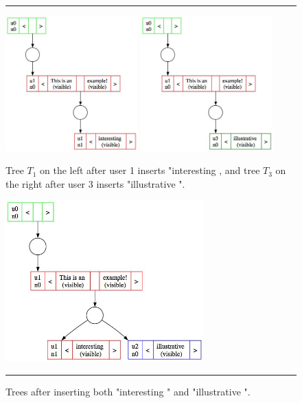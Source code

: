 \documentclass{amsart}
\begin{document}
\begin{figure}[h]
\vspace{\baselineskip}
  \hspace{\fill}\rule{\linewidth}{.7pt}\hspace{\fill}
  \vspace{\baselineskip}

\centering
\includegraphics[width=2in]{tree11.jpg}
\includegraphics[width=2in]{tree12.jpg}
\caption{Tree $T_1$ on the left after user 1 inserts "interesting ,
and tree $T_3$ on the right after user 3 inserts "illustrative ".\label{fig:tree11}}

\centering
\vskip 0.3in
\includegraphics[width=3in]{tree13.jpg}
\caption{Trees after inserting both "interesting " and "illustrative ".\label{fig:tree13}}


\vspace{\baselineskip}%
  \hspace{\fill}\rule{\linewidth}{.7pt}\hspace{\fill}%
\vspace{\baselineskip}%
\end{figure}
\end{document}
